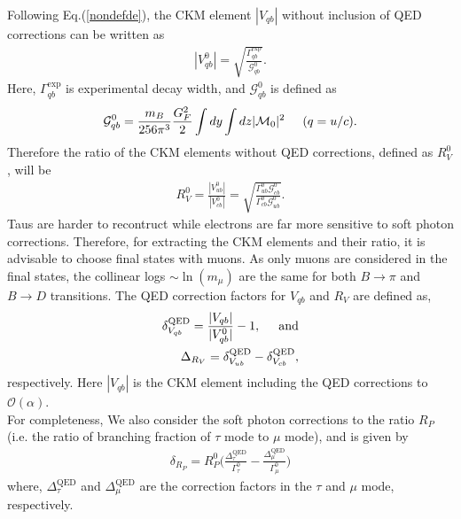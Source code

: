 \documentclass[a4paper,11pt]{article}
\begin{document}
	    		    	Following Eq.(\ref{nondefde}), the CKM element $|V_{qb}|$ without inclusion of QED corrections can be written as
	    	\begin{eqnarray}
	   	|V_{qb}^{0}|=\sqrt{\frac{\Gamma_{qb}^{\text{exp}}}{\mathcal{G}_{qb}^{0}}}.
	   	\label{eqnvqb}
	   	\end{eqnarray}
	   	Here, $\Gamma^{\text{exp}}_{qb}$ is experimental decay width, and $\mathcal{G}_{qb}^0$ is defined as
	   	\begin{eqnarray}
\mathcal{G}_{qb}^0 	=\frac{m_{B}}{256\pi^{3}}\frac{G_{F}^{2}}{2}\int dy \int dz |\mathcal{M}_{0}|^{2} \hspace{0.5cm} (q=u/c).
	\end{eqnarray}
	Therefore the ratio of the CKM elements without QED corrections, defined as $R_V^0$, will be
	\begin{eqnarray}
	   	R_{V}^0=\frac{|V_{ub}^0|}{|V_{cb}^0|}=\sqrt{\frac{\Gamma^{0}_{ub}\mathcal{G}_{cb}^0}{\Gamma^{0}_{cb}\mathcal{G}_{ub}^0}}.
	   	\label{vuc}
	   	\end{eqnarray}
	   	Taus are harder to recontruct while electrons are far more sensitive to soft photon corrections.
	   	Therefore, for extracting the CKM elements and their ratio, it is advisable to choose final states with muons. 
	   	As only muons are considered in the final states, the collinear logs $\sim \ln(m_{\mu})$
are the same for both $B\to \pi$ and $B\to D$ transitions. The QED correction factors for $V_{qb}$ and $R_V$ are defined as,
	\begin{eqnarray}
	\delta_{V_{qb}}^{\text{QED}}=\frac{|V_{qb}|}{|V_{qb}^0|}-1,\hspace{0.5 cm}\text{and}\\
	   	\Delta_{R_{V}}= \delta_{V_{ub}}^{\text{QED}}-\delta_{V_{cb}}^{\text{QED}}
	   	\label{deltaRV},
	   	\end{eqnarray}
	   	respectively. Here $|V_{qb}|$ is the CKM element including the QED corrections to $\mathcal{O}(\alpha)$.\\
    For completeness, We also consider the soft photon corrections to the ratio $R_P$ (i.e. the ratio of branching fraction of $\tau$ mode to $\mu$ mode), and is given by 
	\begin{eqnarray}
	\delta_{R_{P}}=R_P^0\Big(\frac{\Delta_\tau^{\text{QED}}}{\Gamma_{\tau}^0}-\frac{\Delta_\mu^{\text{QED}}}{\Gamma_{\mu}^0}\Big)
	\end{eqnarray}
	 where, $\Delta_\tau^{\text{QED}}$ and $\Delta_\mu^{\text{QED}}$ are the correction factors in the $\tau$ and $\mu$ mode, respectively.
\end{document}
